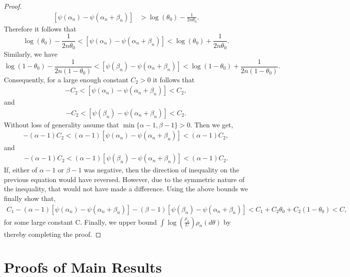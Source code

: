 \documentclass[11pt]{amsart}
\begin{document}
\begin{proof}
\begin{align*}
    \left[\psi(\alpha_n)-\psi(\alpha_n+\beta_n)\right] & >\log(\theta_0)-\frac{1}{2n\theta_0}.
\end{align*}
Therefore it follows that
\begin{equation}
    \log(\theta_0)-\frac{1}{2n\theta_0}<\left[\psi(\alpha_n)-\psi(\alpha_n+\beta_n)\right]< \log(\theta_0)+\frac{1}{2n\theta_0}.
\end{equation}
Similarly, we have
\begin{equation}
    \log(1-\theta_0)-\frac{1}{2n(1-\theta_0)}<\left[\psi(\beta_n)-\psi(\alpha_n+\beta_n)\right]< \log(1-\theta_0)+\frac{1}{2n(1-\theta_0)}.
\end{equation}
Consequently, for a large enough constant $C_2>0$ it follows that
\begin{align*}
    -C_2<\left[\psi(\alpha_n)-\psi(\alpha_n+\beta_n)\right]< C_2,
\end{align*}
and
\begin{align*}
    -C_2<\left[\psi(\beta_n)-\psi(\alpha_n+\beta_n)\right]< C_2.
\end{align*}
Without loss of generality assume that $\min\{\alpha-1,\beta-1\}>0$. Then we get,
\begin{align*}
    -(\alpha-1)C_2<(\alpha-1)\left[\psi(\alpha_n)-\psi(\alpha_n+\beta_n)\right]< (\alpha-1)C_2,
\end{align*}
and
\begin{align*}
    -(\alpha-1)C_2<(\alpha-1)\left[\psi(\beta_n)-\psi(\alpha_n+\beta_n)\right]< (\alpha-1)C_2.
\end{align*}
If, either of $\alpha-1$ or $\beta-1$ was negative, then the direction of inequality on the previous equation would have reversed. However, due to the symmetric nature of the inequality, that would not have made a difference. Using the above bounds we finally show that, 
\begin{align*}
    C_1-(\alpha-1) \left[\psi(\alpha_n)-\psi(\alpha_n+\beta_n)\right]-(\beta-1)\left[\psi(\beta_n)-\psi(\alpha_n+\beta_n)\right]<C_1+C_2\theta_0+C_2(1-\theta_0)<C,
\end{align*}
for some large constant C. Finally, we upper bound $\int \log\left(\frac{\rho_n}{U}\right)\rho_n(d\theta)$ by  thereby completing the proof.
\end{proof}
\section{Proofs of Main Results}
\end{document}
